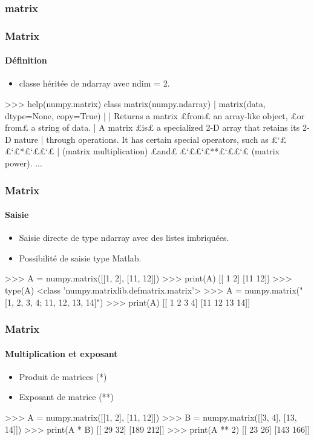 \subsubsection{matrix}
\begin{frame}[fragile]
\frametitle{Matrix}
\framesubtitle{Définition}
\begin{itemize}
 \item classe héritée de ndarray avec ndim = 2.  
\end{itemize}
\begin{pythonConsole}
>>> help(numpy.matrix)
class matrix(numpy.ndarray)
 |  matrix(data, dtype=None, copy=True)
 |  
 |  Returns a matrix £from£ an array-like object, £or from£ a string of data.
 |  A matrix £is£ a specialized 2-D array that retains its 2-D nature
 |  through operations.  It has certain special operators, such as £`££`£*£`££`£
 |  (matrix multiplication) £and£ £`££`£**£`££`£ (matrix power).
...
\end{pythonConsole}
\end{frame}
\begin{frame}[fragile]
\frametitle{Matrix}
\framesubtitle{Saisie}
\begin{itemize}
 \item Saisie directe de type ndarray avec des listes imbriquées. 
 \item Possibilité de saisie type Matlab.
\end{itemize}
\begin{pythonConsole}
>>> A = numpy.matrix([[1, 2], [11, 12]])
>>> print(A)
[[ 1  2]
 [11 12]]
>>> type(A)
 <class 'numpy.matrixlib.defmatrix.matrix'>
>>> A = numpy.matrix("[1, 2, 3, 4; 11, 12, 13, 14]")
>>> print(A)
[[ 1  2  3  4]
 [11 12 13 14]]
\end{pythonConsole}
\end{frame}
\begin{frame}[fragile]
\frametitle{Matrix}
\framesubtitle{Multiplication et exposant}
\begin{itemize}
 \item Produit de matrices (*)
 \item Exposant de matrice (**)
\end{itemize}
\begin{pythonConsole}
>>> A = numpy.matrix([[1, 2], [11, 12]])
>>> B = numpy.matrix([[3, 4], [13, 14]])
>>> print(A * B)
[[ 29  32]
 [189 212]]
>>> print(A ** 2)
[[ 23  26]
 [143 166]]
\end{pythonConsole}
\end{frame}
